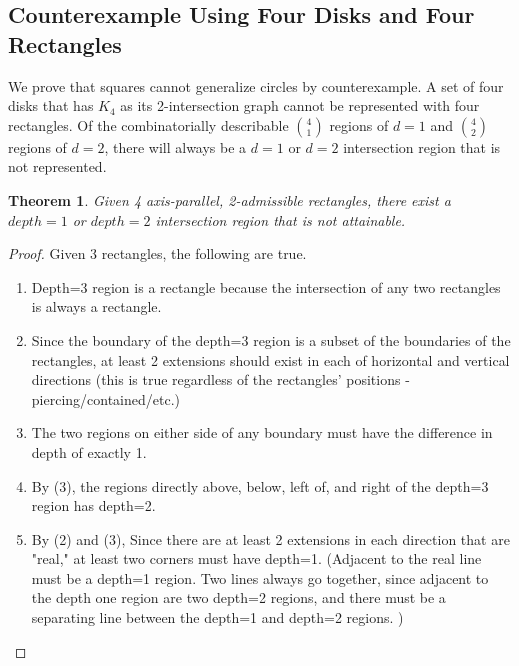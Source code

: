 \documentclass{NSF}
\newtheorem{theorem}{Theorem}[section]
\begin{document}
\subsection{Counterexample Using Four Disks and Four Rectangles}
We prove that squares cannot generalize circles by counterexample. A set of four disks that has $K_4$ as its 2-intersection graph cannot be represented with four rectangles. Of the combinatorially describable $\binom{4}{1}$ regions of $d=1$ and $\binom{4}{2}$ regions of $d=2$, there will always be a $d=1$ or $d=2$ intersection region that is not represented.

\begin{theorem}
Given 4 axis-parallel, 2-admissible rectangles, there exist a $depth=1$ or $depth=2$ intersection region that is not attainable.
\end{theorem}
\begin{proof}
Given 3 rectangles, the following are true.
\begin{enumerate}
\item Depth=3 region is a rectangle because the intersection of any two rectangles is always a rectangle. 
\item Since the boundary of the depth=3 region is a subset of the boundaries of the rectangles, at least 2 extensions should exist in each of horizontal and vertical directions (this is true regardless of the rectangles' positions - piercing/contained/etc.)
\item The two regions on either side of any boundary must have the difference in depth of exactly 1. 
\item By (3), the regions directly above, below, left of, and right of the depth=3 region has depth=2. 
\item By (2) and (3), Since there are at least 2 extensions in each direction that are "real," at least two corners must have depth=1. (Adjacent to the real line must be a depth=1 region. Two lines always go together, since adjacent to the depth one region are two depth=2 regions, and there must be a separating line between the depth=1 and depth=2 regions. )

\end{enumerate}
\end{proof}
\end{document}
